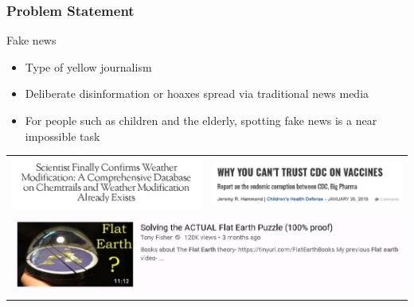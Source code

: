 \documentclass{beamer}
\begin{document}
\date{}


\frame{\titlepage}


\begin{frame} \frametitle{Problem Statement}
Fake news
	    \begin{itemize}
			\item Type of yellow journalism
			\item Deliberate disinformation or hoaxes spread via traditional news media
			\item For people such as children and the elderly, spotting fake news is a near impossible task
		\end{itemize}
		\vfill
	\begin{tabular}{ c c }
	
			\includegraphics[scale=0.3,frame]{Figures/Chemtrails.pdf} & \includegraphics[scale=0.3,frame]{Figures/Vaccines.pdf}  \\ \multicolumn{2}{c}{\includegraphics[scale=0.25,frame]{Figures/Flat_earth.pdf}}
	\end{tabular}	
		

		
		


\end{frame}
\end{document}
